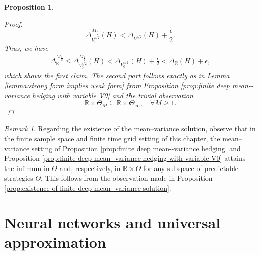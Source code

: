 \documentclass[11pt,a4paper,twoside,openany]{report}
\numberwithin{equation}{section}
\theoremstyle{plain} %
\newtheorem{proposition}[theorem]{Proposition}
\theoremstyle{definition} %
\theoremstyle{remark} %
\newtheorem{remark}[theorem]{Remark}
\begin{document}
\begin{proposition}
\begin{proof}
        \begin{equation*}
           \Delta^{M_{\frac{\epsilon}{2}}}_{V_0^{\epsilon/2}}(H)< \Delta_{V_0^{\epsilon/2}}(H)+\frac{\epsilon}{2}.
        \end{equation*}
Thus, we have
        \begin{align*}
            \Delta^{M_{\frac{\epsilon}{2}}}_{\mathbb{R}}\leq\Delta^{M_{\frac{\epsilon}{2}}}_{V_0^{\epsilon/2}}(H)<\Delta_{V_0^{\epsilon/2}}(H)+\frac{\epsilon}{2}<\Delta_{\mathbb{R}}(H)+\epsilon,
        \end{align*}
which shows the first claim. The second part follows exactly as in Lemma \ref{lemma:strong form implies weak form} from Proposition \ref{prop:finite deep mean--variance hedging with variable V0} and the trivial observation
        \begin{equation*}
        \mathbb{R}\times\Theta_M\subseteq \mathbb{R}\times\Theta_{\infty},\quad\forall M\geq 1.
        \end{equation*}
        \end{proof}
\end{proposition}
\begin{remark}
 Regarding the existence of the mean--variance solution, observe that in the finite sample space and finite time grid setting of this chapter, the mean--variance setting of Proposition \ref{prop:finite deep mean--variance hedging} and Proposition \ref{prop:finite deep mean--variance hedging with variable V0} attains the infimum in \(\Theta\) and, respectively, in \(\mathbb{R}\times\Theta\) for any subspace of predictable strategies \(\Theta\). This follows from the observation made in Proposition \ref{prop:existence of finite deep mean--variance solution}.
\end{remark}

\chapter{Neural networks and universal approximation}\label{ch:Neural Networks and Universal Approximation}
\end{document}
